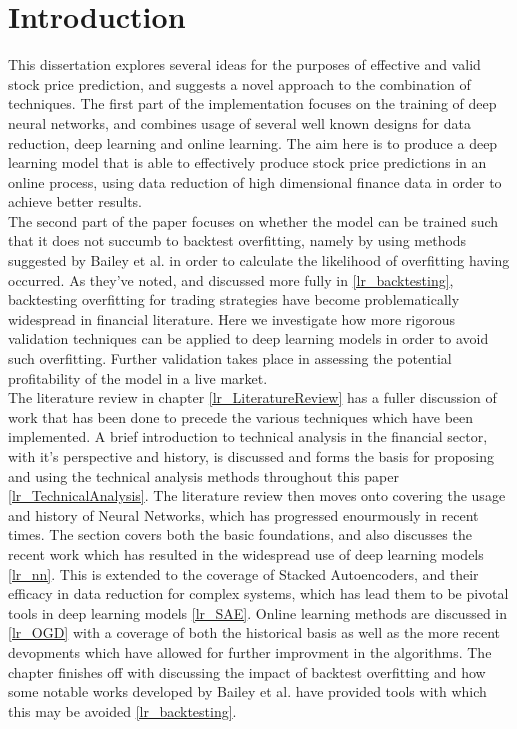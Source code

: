\documentclass[a4paper,latin]{paper}
\begin{document}
\section{Introduction}\label{Introduction}


This dissertation explores several ideas for the purposes of effective and valid stock price prediction, and suggests a novel approach to the combination of techniques. The first part of the implementation focuses on the training of deep neural networks, and combines usage of several well known designs for data reduction, deep learning and online learning. The aim here is to produce a deep learning model that is able to effectively produce stock price predictions in an online process, using data reduction of high dimensional finance data in order to achieve better results. 
~\\\newline
The second part of the paper focuses on whether the model can be trained such that it does not succumb to backtest overfitting, namely by using methods suggested by Bailey et al. \cite{BailyPBO} in order to calculate the likelihood of overfitting having occurred. As they've noted, and discussed more fully in \ref{lr_backtesting}, backtesting overfitting for trading strategies have become problematically widespread in financial literature. Here we investigate how more rigorous validation techniques can be applied to deep learning models in order to avoid such overfitting. Further validation takes place in assessing the potential profitability of the model in a live market.
~\\\newline
The literature review in chapter \ref{lr_LiteratureReview} has a fuller discussion of work that has been done to precede the various techniques which have been implemented. A brief introduction to technical analysis in the financial sector, with it's perspective and history, is discussed and forms the basis for proposing and using the technical analysis methods throughout this paper \ref{lr_TechnicalAnalysis}. The literature review then moves onto covering the usage and history of Neural Networks, which has progressed enourmously in recent times. The section covers both the basic foundations, and also discusses the recent work which has resulted in the widespread use of deep learning models \ref{lr_nn}. This is extended to the coverage of Stacked Autoencoders, and their efficacy in data reduction for complex systems, which has lead them to be pivotal tools in deep learning models \ref{lr_SAE}. Online learning methods are discussed in \ref{lr_OGD} with a coverage of both the historical basis as well as the more recent devopments which have allowed for further improvment in the algorithms. The chapter finishes off with discussing the impact of backtest overfitting and how some notable works developed by Bailey et al. have provided tools with which this may be avoided \ref{lr_backtesting}.
\end{document}
